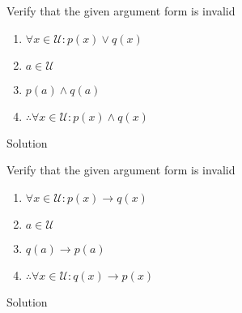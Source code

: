 \newpage
\begin{longfbox}
    \begin{bt} \label{pro:practice2.41}
        Verify that the given argument form is invalid
        \begin{enumerate}
            \item[] $\forall x \in \mathcal U: p(x) \lor q(x)$
            \item[] $a \in \mathcal U$
            \item[] $p(a)\land q(a)$
            \item[] $\therefore \forall x \in \mathcal U: p(x) \land q(x)$
        \end{enumerate}
    \end{bt}
\end{longfbox}
Solution


\newpage
\begin{longfbox}
    \begin{bt} \label{pro:practice2.42}
        Verify that the given argument form is invalid
        \begin{enumerate}
            \item[] $\forall x \in \mathcal U: p(x) \rightarrow q(x)$
            \item[] $a \in \mathcal U$
            \item[] $q(a) \rightarrow p(a)$
            \item[] $\therefore \forall x \in \mathcal U: q(x) \rightarrow p(x)$
        \end{enumerate}
    \end{bt}
\end{longfbox}
Solution


